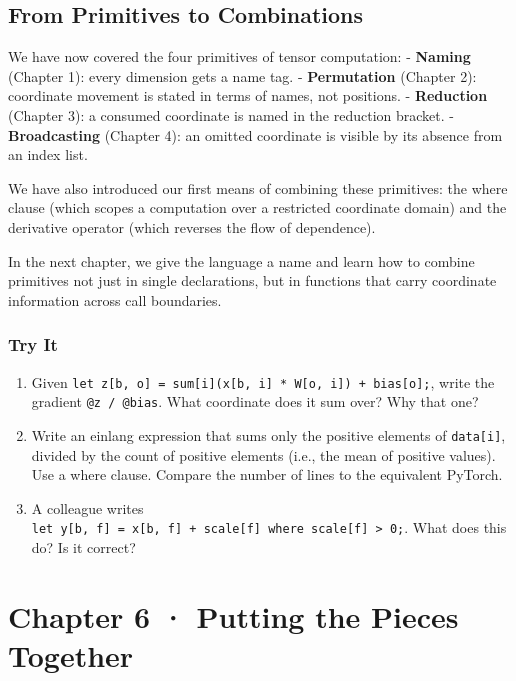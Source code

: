 \documentclass[11pt,]{article}
\begin{document}
\hypertarget{from-primitives-to-combinations}{%
\subsection{From Primitives to
Combinations}\label{from-primitives-to-combinations}}

We have now covered the four primitives of tensor computation: -
\textbf{Naming} (Chapter 1): every dimension gets a name tag. -
\textbf{Permutation} (Chapter 2): coordinate movement is stated in terms
of names, not positions. - \textbf{Reduction} (Chapter 3): a consumed
coordinate is named in the reduction bracket. - \textbf{Broadcasting}
(Chapter 4): an omitted coordinate is visible by its absence from an
index list.

We have also introduced our first means of combining these primitives:
the where clause (which scopes a computation over a restricted
coordinate domain) and the derivative operator (which reverses the flow
of dependence).

In the next chapter, we give the language a name and learn how to
combine primitives not just in single declarations, but in functions
that carry coordinate information across call boundaries.

\hypertarget{try-it-4}{%
\subsubsection{Try It}\label{try-it-4}}

\begin{enumerate}
\def\labelenumi{\arabic{enumi}.}
\item
  Given
  \texttt{let\ z{[}b,\ o{]}\ =\ sum{[}i{]}(x{[}b,\ i{]}\ *\ W{[}o,\ i{]})\ +\ bias{[}o{]};},
  write the gradient \texttt{@z\ /\ @bias}. What coordinate does it sum
  over? Why that one?
\item
  Write an einlang expression that sums only the positive elements of
  \texttt{data{[}i{]}}, divided by the count of positive elements (i.e.,
  the mean of positive values). Use a where clause. Compare the number
  of lines to the equivalent PyTorch.
\item
  A colleague writes
  \texttt{let\ y{[}b,\ f{]}\ =\ x{[}b,\ f{]}\ +\ scale{[}f{]}\ where\ scale{[}f{]}\ \textgreater{}\ 0;}.
  What does this do? Is it correct?
\end{enumerate}

\newpage

\hypertarget{chapter-6-putting-the-pieces-together}{%
\section{Chapter 6 · Putting the Pieces
Together}\label{chapter-6-putting-the-pieces-together}}
\end{document}
